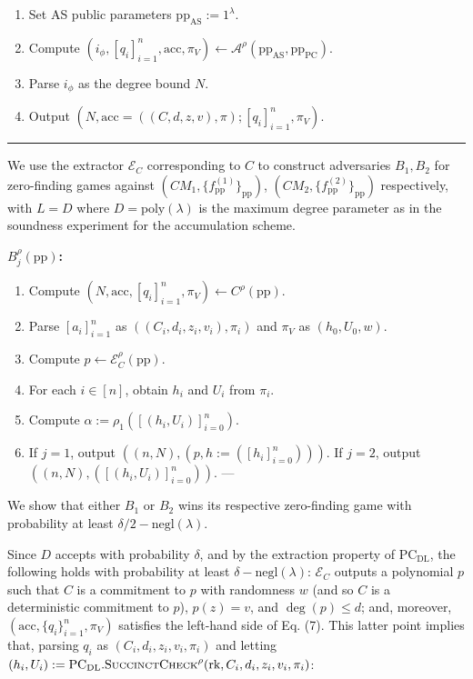 \documentclass[
]{article}
\providecommand{\tightlist}{%
  \setlength{\itemsep}{0pt}\setlength{\parskip}{0pt}}
\newcommand*{\PCDL}{\text{PC}_{\text{DL}}}
\newcommand*{\PCDLSuccinctCheck}{\PCDL.\mathrm{\text{S{\scriptsize UCCINCT}C{\scriptsize HECK}}}}
\begin{document}
\begin{enumerate}
\def\labelenumi{\arabic{enumi}.}
\tightlist
\item
  Set AS public parameters \(\text{pp}_{\text{AS}} := 1^\lambda\).
\item
  Compute \((i_\phi, [q_i]_{i=1}^n, \text{acc}, \pi_V) \leftarrow
  \mathcal{A}^\rho(\text{pp}_{\text{AS}}, \text{pp}_{\text{PC}})\).
\item
  Parse \(i_\phi\) as the degree bound \(N\).
\item
  Output
  \((N, \text{acc} = ((C, d, z, v), \pi); [q_i]_{i=1}^n, \pi_V)\).
\end{enumerate}

\begin{center}\rule{0.5\linewidth}{0.5pt}\end{center}

We use the extractor \(\mathcal{E}_C\) corresponding to \(C\) to
construct adversaries \(B_1, B_2\) for zero-finding games against
\((CM_1, \{f_{\text{pp}}^{(1)}\}_{\text{pp}})\), \((CM_2,
\{f_{\text{pp}}^{(2)}\}_{\text{pp}})\) respectively, with \(L = D\)
where \(D =
\text{poly}(\lambda)\) is the maximum degree parameter as in the
soundness experiment for the accumulation scheme.

\textbf{\(B_j^\rho(\text{pp})\):}

\begin{enumerate}
\def\labelenumi{\arabic{enumi}.}
\tightlist
\item
  Compute \((N, \text{acc}, [q_i]_{i=1}^n, \pi_V) \leftarrow
  C^\rho(\text{pp})\).
\item
  Parse \([a_i]_{i=1}^n\) as \(((C_i, d_i, z_i, v_i), \pi_i)\) and
  \(\pi_V\) as \((h_0, U_0, w)\).
\item
  Compute \(p \leftarrow \mathcal{E}_C^\rho(\text{pp})\).
\item
  For each \(i \in [n]\), obtain \(h_i\) and \(U_i\) from \(\pi_i\).
\item
  Compute \(\alpha := \rho_1([(h_i, U_i)]_{i=0}^n)\).
\item
  If \(j = 1\), output \(((n, N), (p, h := ([h_i]_{i=0}^n)))\). If
  \(j = 2\), output \(((n, N), ([(h_i, U_i)]_{i=0}^n))\). ---
\end{enumerate}

We show that either \(B_1\) or \(B_2\) wins its respective zero-finding
game with probability at least \(\delta / 2 - \text{negl}(\lambda)\).

Since \(D\) accepts with probability \(\delta\), and by the extraction
property of \(\PCDL\), the following holds with probability at least
\(\delta -
\text{negl}(\lambda)\): \(\mathcal{E}_C\) outputs a polynomial \(p\)
such that \(C\) is a commitment to \(p\) with randomness \(w\) (and so
\(C\) is a deterministic commitment to \(p\)), \(p(z) = v\), and
\(\deg(p) \leq d\); and, moreover,
\((\text{acc}, \{q_i\}_{i=1}^n, \pi_V)\) satisfies the left-hand side of
Eq. (7). This latter point implies that, parsing \(q_i\) as
\((C_i, d_i, z_i,
v_i, \pi_i)\) and letting \((h_i, U_i) := \PCDLSuccinctCheck^\rho
(\text{rk}, C_i, d_i, z_i, v_i, \pi_i)\):
\end{document}
